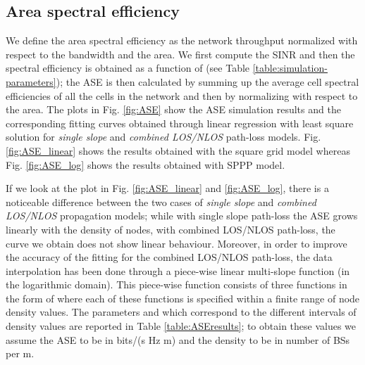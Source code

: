 \documentclass[twocoumn]{IEEEtran}
\begin{document}
\vspace{-5mm}
\subsection{Area spectral efficiency} \label{sub:Area_Spectral_Efficiency}

We define the area spectral efficiency as the network throughput normalized with respect to the bandwidth and the area. We first compute the SINR  and then the spectral efficiency is obtained as a
function  of  (see Table \ref{table:simulation-parameters});
the ASE is then calculated by summing up the average cell spectral efficiencies of all the cells in the network  and then by normalizing with respect to the area. The plots in Fig. \ref{fig:ASE} show the ASE simulation results and the corresponding fitting curves obtained through linear regression with least square solution for \textit{single slope} and \textit{combined LOS/NLOS} path-loss models. Fig. \ref{fig:ASE_linear} shows the results obtained with the square grid model whereas Fig. \ref{fig:ASE_log} shows the results obtained with SPPP model.

\begin{figure*}[]
\centering
\hspace{1em}
\caption{ASE vs cell density: square grid (a) and SPPP based model (b).}
\label{fig:ASE}
\vspace{-6mm}
\end{figure*}

If we look at the plot in Fig. \ref{fig:ASE_linear} and \ref{fig:ASE_log}, there is a noticeable  difference  between the two cases of \textit{single slope} and \textit{combined LOS/NLOS} propagation models; while with single slope path-loss the ASE grows linearly with the density of nodes, with combined LOS/NLOS path-loss, the curve we obtain does not show linear behaviour. 
Moreover, in order to improve the accuracy of the fitting for the combined LOS/NLOS path-loss, the data interpolation has been done through a piece-wise linear multi-slope function (in the logarithmic domain).
This piece-wise function consists of three functions in the form of
 where each of these functions
is specified within a finite range of node density values. The parameters
 and  which correspond to the different
intervals of density values  are reported in Table \ref{table:ASEresults}; to obtain these values we assume the ASE to be in bits/(s Hz  m) and the density  to be in number of BSs per m.
\end{document}
